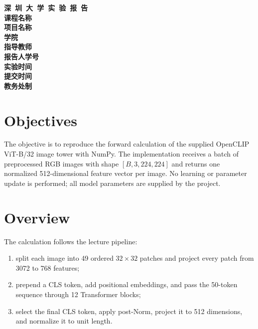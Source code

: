 \documentclass[a4paper,12pt]{article}
\begin{document}
\begin{titlepage}
\centering
\vspace*{2cm}
\Huge{\textbf{深\ 圳\ 大\ 学\ 实\ 验\ 报\ 告}}\\[1.3cm]
{\Large\textbf{课程名称}\quad\underline{}}\\[0.5cm]
{\Large\textbf{项目名称}\quad\underline{}}\\[0.5cm]
{\Large\textbf{学院}\quad\underline{}}\\[0.5cm]
{\Large\textbf{指导教师}\quad\underline{}}\\[0.5cm]
{\Large\textbf{报告人}\quad\underline{}\quad\textbf{学号}\quad\underline{}}\\[0.5cm]
{\Large\textbf{实验时间}\quad\underline{}}\\[0.5cm]
{\Large\textbf{提交时间}\quad\underline{}}\\[2cm]
\vfill {\Large\textbf{教务处制}}
\end{titlepage}

\section{Objectives}
The objective is to reproduce the forward calculation of the supplied OpenCLIP ViT-B/32 image tower with NumPy. The implementation receives a batch of preprocessed RGB images with shape $[B,3,224,224]$ and returns one normalized 512-dimensional feature vector per image. No learning or parameter update is performed; all model parameters are supplied by the project.

\section{Overview}
The calculation follows the lecture pipeline:
\begin{enumerate}[label=\arabic*.]
\item split each image into 49 ordered $32\times32$ patches and project every patch from 3072 to 768 features;
\item prepend a CLS token, add positional embeddings, and pass the 50-token sequence through 12 Transformer blocks;
\item select the final CLS token, apply post-Norm, project it to 512 dimensions, and normalize it to unit length.
\end{enumerate}
\end{document}
